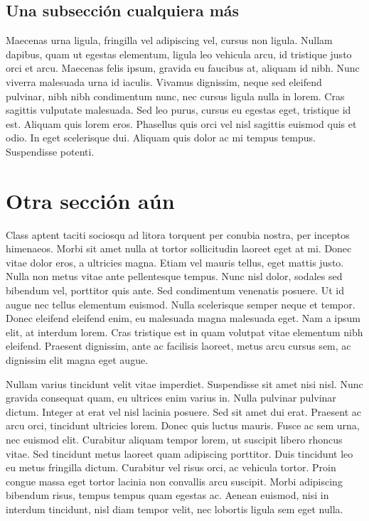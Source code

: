 \documentclass[a4paper,10pt]{article}
\begin{document}
\begin{multicols}{3}
\subsection{Una subsección cualquiera más}
Maecenas urna ligula, fringilla vel adipiscing vel, cursus non ligula. Nullam dapibus, quam ut egestas elementum, ligula leo vehicula 
arcu, 
id tristique justo orci et arcu. Maecenas felis ipsum, gravida eu faucibus at, aliquam id nibh. Nunc viverra malesuada urna id iaculis. 
Vivamus dignissim, neque sed eleifend pulvinar, nibh nibh condimentum nunc, nec cursus ligula nulla in lorem. Cras sagittis vulputate 
malesuada. Sed leo purus, cursus eu egestas eget, tristique id est. Aliquam quis lorem eros. Phasellus quis orci vel nisl sagittis euismod 
quis et odio. In eget scelerisque dui. Aliquam quis dolor ac mi tempus tempus. Suspendisse potenti.

\section{Otra sección aún}
Class aptent taciti sociosqu ad litora torquent per conubia nostra, per inceptos himenaeos. Morbi sit amet nulla at tortor sollicitudin 
laoreet eget at mi. Donec vitae dolor eros, a ultricies magna. Etiam vel mauris tellus, eget mattis justo. Nulla non metus vitae ante 
pellentesque tempus. Nunc nisl dolor, sodales sed bibendum vel, porttitor quis ante. Sed condimentum venenatis posuere. Ut id augue nec 
tellus elementum euismod. Nulla scelerisque semper neque et tempor. Donec eleifend eleifend enim, eu malesuada magna malesuada eget. Nam a 
ipsum elit, at interdum lorem. Cras tristique est in quam volutpat vitae elementum nibh eleifend. Praesent dignissim, ante ac facilisis 
laoreet, metus arcu cursus sem, ac dignissim elit magna eget augue.

Nullam varius tincidunt velit vitae imperdiet. Suspendisse sit amet nisi nisl. Nunc gravida consequat quam, eu ultrices enim varius in. 
Nulla 
pulvinar pulvinar dictum. Integer at erat vel nisl lacinia posuere. Sed sit amet dui erat. Praesent ac arcu orci, tincidunt ultricies 
lorem. 
Donec quis luctus mauris. Fusce ac sem urna, nec euismod elit. Curabitur aliquam tempor lorem, ut suscipit libero rhoncus vitae. Sed 
tincidunt metus laoreet quam adipiscing porttitor. Duis tincidunt leo eu metus fringilla dictum. Curabitur vel risus orci, ac vehicula 
tortor. Proin congue massa eget tortor lacinia non convallis arcu suscipit. Morbi adipiscing bibendum risus, tempus tempus quam egestas 
ac. 
Aenean euismod, nisi in interdum tincidunt, nisl diam tempor velit, nec lobortis ligula sem eget nulla.


\end{multicols}
\end{document}
